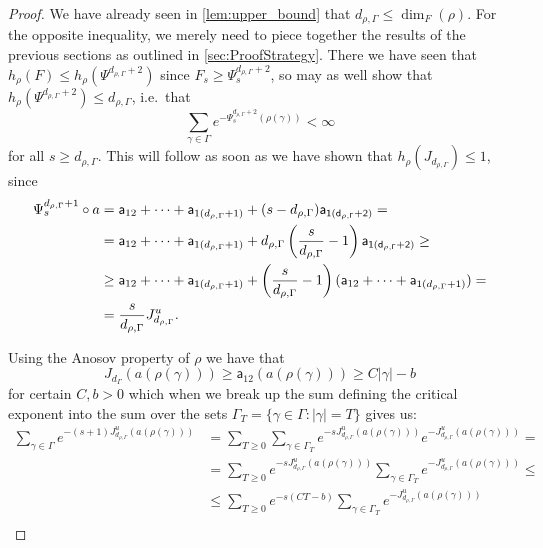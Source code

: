 \documentclass{report}
\begin{document}
\begin{proof}
    We have already seen in \cref{lem:upper_bound} that $d_{\rho, \Gamma} \leq \dim_F(\rho)$.
    For the opposite inequality, we merely need to piece together the results of the previous sections as outlined in \cref{sec:ProofStrategy}.
    There we have seen that $h_\rho(F) \leq h_\rho(\Psi^{d_{\rho, \Gamma} + 2})$ since $F_s \geq \Psi_s^{d_{\rho, \Gamma} + 2}$, so may as well show that $h_\rho(\Psi^{d_{\rho, \Gamma} + 2}) \leq d_{\rho, \Gamma}$, i.e.\ that
    \[
        \sum_{\gamma \in \Gamma} e^{-\Psi^{d_{\rho, \Gamma} + 2}_s(\rho(\gamma))} < \infty
    \]
    for all $s \geq d_{\rho, \Gamma}$.
    This will follow as soon as we have shown that $h_\rho(J_{d_{\rho, \Gamma}}) \leq 1$, since
    \begin{align*}
        \Psi_s^{d_{\rho, \Gamma} + 1} \circ a &=
        {\sf a}_{12} + \cdots + {\sf a}_{1(d_{\rho, \Gamma} + 1)} + (s-d_{\rho, \Gamma}) {\sf a_{1(d_{\rho, \Gamma}+2)}} =\\
        &= 
        {\sf a}_{12} + \cdots + {\sf a}_{1(d_{\rho, \Gamma} + 1)} + d_{\rho, \Gamma}\left(\frac{s}{d_{\rho, \Gamma}}-1\right) {\sf a_{1(d_{\rho, \Gamma}+2)}} \geq\\
        &\geq
        {\sf a}_{12} + \cdots + {\sf a}_{1(d_{\rho, \Gamma} + 1)} + \left(\frac{s}{d_{\rho, \Gamma}}-1\right) ({\sf a}_{12} + \cdots + {\sf a}_{1(d_{\rho, \Gamma} + 1)}) =\\
        &=
        \frac{s}{d_{\rho, \Gamma}} J_{d_{\rho, \Gamma}}^u.
    \end{align*}
    
    Using the Anosov property of $\rho$ we have that
    \[
    J_{d_\Gamma}(a(\rho(\gamma))) \geq \mathsf a_{12} (a(\rho(\gamma))) \geq C|\gamma| - b    
    \]
    for certain $C, b > 0$ which when we break up the sum defining the critical exponent into the sum over the sets $\Gamma_T = \{ \gamma \in \Gamma: |\gamma| = T\}$ gives us:
    \begin{align*}
        \sum_{\gamma \in \Gamma} e^{-(s+1)J_{d_{\rho, \Gamma}}^u(a(\rho(\gamma)))} &=
        \sum_{T \geq 0} \sum_{\gamma \in \Gamma_T} e^{-s J_{d_{\rho, \Gamma}}^u(a(\rho(\gamma)))}
        e^{-J_{d_{\rho, \Gamma}}^u(a(\rho(\gamma)))} =\\
        &=
        \sum_{T \geq 0} e^{-s J_{d_{\rho, \Gamma}}^u(a(\rho(\gamma)))} 
            \sum_{\gamma \in \Gamma_T} e^{-J_{d_{\rho, \Gamma}}^u(a(\rho(\gamma)))} \leq\\
        &\leq
        \sum_{T \geq 0} e^{-s (C T - b)} 
            \sum_{\gamma \in \Gamma_T} e^{-J_{d_{\rho, \Gamma}}^u(a(\rho(\gamma)))}\\
    \end{align*}
    

\end{proof}
\end{document}
